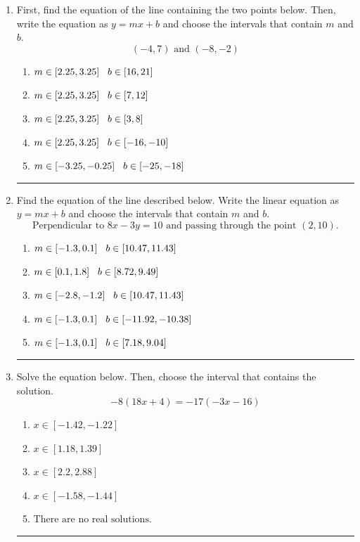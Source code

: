 \documentclass[14pt]{extbook}
\newcommand{\litem}[1]{\item#1\hspace*{-1cm}\rule{\textwidth}{0.4pt}}
\begin{document}
\begin{enumerate}
\litem{
First, find the equation of the line containing the two points below. Then, write the equation as $ y=mx+b $ and choose the intervals that contain $m$ and $b$.\[ (-4, 7) \text{ and } (-8, -2) \]\begin{enumerate}[label=\Alph*.]
\item \( m \in [2.25, 3.25] \hspace*{3mm} b \in [16, 21] \)
\item \( m \in [2.25, 3.25] \hspace*{3mm} b \in [7, 12] \)
\item \( m \in [2.25, 3.25] \hspace*{3mm} b \in [3, 8] \)
\item \( m \in [2.25, 3.25] \hspace*{3mm} b \in [-16, -10] \)
\item \( m \in [-3.25, -0.25] \hspace*{3mm} b \in [-25, -18] \)

\end{enumerate} }
\litem{
Find the equation of the line described below. Write the linear equation as $ y=mx+b $ and choose the intervals that contain $m$ and $b$.\[ \text{Perpendicular to } 8 x - 3 y = 10 \text{ and passing through the point } (2, 10). \]\begin{enumerate}[label=\Alph*.]
\item \( m \in [-1.3, 0.1] \hspace*{3mm} b \in [10.47, 11.43] \)
\item \( m \in [0.1, 1.8] \hspace*{3mm} b \in [8.72, 9.49] \)
\item \( m \in [-2.8, -1.2] \hspace*{3mm} b \in [10.47, 11.43] \)
\item \( m \in [-1.3, 0.1] \hspace*{3mm} b \in [-11.92, -10.38] \)
\item \( m \in [-1.3, 0.1] \hspace*{3mm} b \in [7.18, 9.04] \)

\end{enumerate} }
\litem{
Solve the equation below. Then, choose the interval that contains the solution.\[ -8(18x + 4) = -17(-3x -16) \]\begin{enumerate}[label=\Alph*.]
\item \( x \in [-1.42, -1.22] \)
\item \( x \in [1.18, 1.39] \)
\item \( x \in [2.2, 2.88] \)
\item \( x \in [-1.58, -1.44] \)
\item \( \text{There are no real solutions.} \)


\end{enumerate}}
\end{enumerate}
\end{document}
